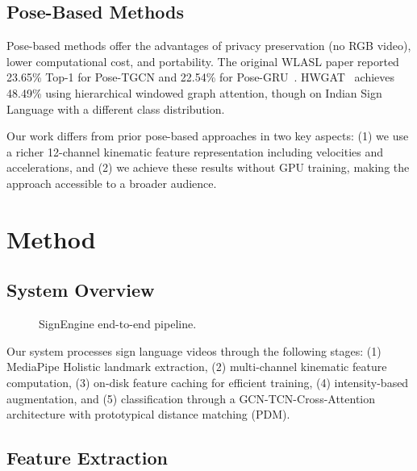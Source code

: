 \documentclass[conference]{IEEEtran}
\begin{document}
\subsection{Pose-Based Methods}

Pose-based methods offer the advantages of privacy preservation (no RGB video), lower computational cost, and portability. The original WLASL paper reported 23.65\% Top-1 for Pose-TGCN and 22.54\% for Pose-GRU~\cite{wlasl2020}. HWGAT~\cite{hwgat2024} achieves 48.49\% using hierarchical windowed graph attention, though on Indian Sign Language with a different class distribution.

Our work differs from prior pose-based approaches in two key aspects: (1) we use a richer 12-channel kinematic feature representation including velocities and accelerations, and (2) we achieve these results without GPU training, making the approach accessible to a broader audience.

\section{Method}

\subsection{System Overview}

\begin{figure}[htbp]
\centering
\vspace{6pt}
\caption{SignEngine end-to-end pipeline.}
\label{fig:pipeline}
\end{figure}

Our system processes sign language videos through the following stages: (1) MediaPipe Holistic landmark extraction, (2) multi-channel kinematic feature computation, (3) on-disk feature caching for efficient training, (4) intensity-based augmentation, and (5) classification through a GCN-TCN-Cross-Attention architecture with prototypical distance matching (PDM).

\subsection{Feature Extraction}
\end{document}
